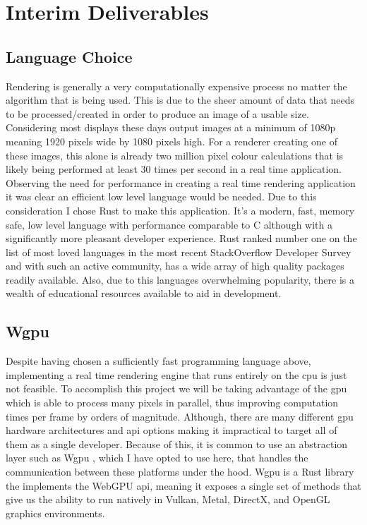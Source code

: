 \documentclass[titlepage]{article}
\begin{document}
\section{Interim Deliverables}
\subsection{Language Choice}
Rendering is generally a very computationally expensive process no matter the algorithm that is being used. This is due to the sheer amount of data that needs to be processed/created in order to produce an image of a usable size. Considering most displays these days output images at a minimum of 1080p meaning 1920 pixels wide by 1080 pixels high. For a renderer creating one of these images, this alone is already two million pixel colour calculations that is likely being performed at least 30 times per second in a real time application. Observing the need for performance in creating a real time rendering application it was clear an efficient low level language would be needed. Due to this consideration I chose Rust to make this application. It's a modern, fast, memory safe, low level language with performance comparable to C although with a significantly more pleasant developer experience. Rust ranked number one on the list of most loved languages in the most recent StackOverflow Developer Survey \cite{survey} and with such an active community, has a wide array of high quality packages readily available. Also, due to this languages overwhelming popularity, there is a wealth of educational resources available to aid in development.

\subsection{Wgpu}
Despite having chosen a sufficiently fast programming language above, implementing a real time rendering engine that runs entirely on the \acrfull{cpu} is just not feasible. To accomplish this project we will be taking advantage of the \acrfull{gpu} which is able to process many pixels in parallel, thus improving computation times per frame by orders of magnitude. Although, there are many different \acrshort{gpu} hardware architectures and \acrfull{api} options making it impractical to target all of them as a single developer. Because of this, it is common to use an abstraction layer such as Wgpu \cite{wgpu:source}, which I have opted to use here, that handles the communication between these platforms under the hood. Wgpu is a Rust library the implements the WebGPU \cite{webgpu} \acrshort{api}, meaning it exposes a single set of methods that give us the ability to run natively in Vulkan, Metal, DirectX, and OpenGL graphics environments.
\end{document}

